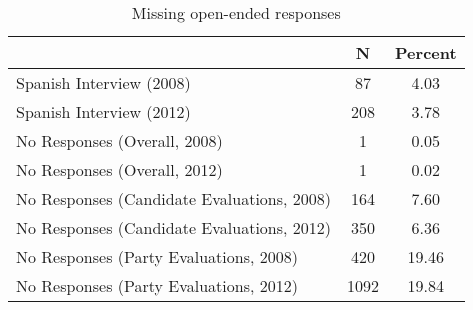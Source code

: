 \begin{table}[ht]
\centering
\begin{tabular}{lcc}
  \hline
 & N & Percent \\ 
  \hline
Spanish Interview (2008) & 87 & 4.03 \\ 
  Spanish Interview (2012) & 208 & 3.78 \\ 
  No Responses (Overall, 2008) & 1 & 0.05 \\ 
  No Responses (Overall, 2012) & 1 & 0.02 \\ 
  No Responses (Candidate Evaluations, 2008) & 164 & 7.60 \\ 
  No Responses (Candidate Evaluations, 2012) & 350 & 6.36 \\ 
  No Responses (Party Evaluations, 2008) & 420 & 19.46 \\ 
  No Responses (Party Evaluations, 2012) & 1092 & 19.84 \\ 
   \hline
\end{tabular}
\caption{Missing open-ended responses} 
\label{tab:appB1mis}
\end{table}
